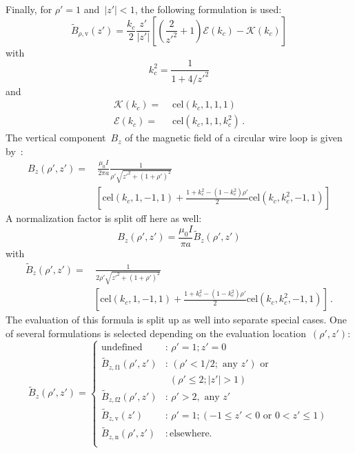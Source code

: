 Finally, for $\rho'=1$ and~$|z'| < 1$, the following formulation is used:
\begin{equation}
  \tilde{B}_{\rho,\mathrm{v}} (z')
  = \frac{k_c}{2} \frac{z'}{|z'|} \left[ \left( \frac{2}{z'^2} + 1 \right) \mathcal{E}(k_c) - \mathcal{K}(k_c) \right] \label{eqn:cwl_B_rho_v}
\end{equation}
with
\begin{equation}
  k_c^2 = \frac{1}{1 + 4/{z'}^2}
\end{equation}
and
\begin{align}
  \mathcal{K}(k_c) =&\, \,\mathrm{cel}(k_c, 1, 1, 1) \\
  \mathcal{E}(k_c) =&\, \,\mathrm{cel}(k_c, 1, 1, k_c^2) \, .
\end{align}
The vertical component~$B_z$ of the magnetic field of a circular wire loop is given by~\cite{teal}:
\begin{align}
 B_z(\rho', z')
 =&\, \frac{\mu_0 I}{2 \pi a}
   \frac{1}{\rho' \sqrt{z'^2 + (1 + \rho')^2}} \nonumber \\
 ~& \left[
       \textrm{cel}(k_c, 1, -1, 1)
     + \frac{1 + k_c^2 - \left( 1 - k_c^2 \right) \rho'}{2} \textrm{cel}(k_c, k_c^2, -1, 1)
   \right]
\end{align}
A normalization factor is split off here as well:
\begin{equation}
  B_z(\rho', z') = \frac{\mu_0 I}{\pi a} \tilde{B}_z(\rho', z')
\end{equation}
with
\begin{align}
  \tilde{B}_z(\rho', z')
  =&\, \frac{1}{2 \rho' \sqrt{z'^2 + (1 + \rho')^2}} \nonumber \\
 ~& \left[
       \textrm{cel}(k_c, 1, -1, 1)
     + \frac{1 + k_c^2 - \left( 1 - k_c^2 \right) \rho'}{2} \textrm{cel}(k_c, k_c^2, -1, 1)
   \right] \, .
\end{align}
The evaluation of this formula is split up as well into separate special cases.
One of several formulations is selected depending on the evaluation location~$(\rho', z')$:
\begin{equation}
  \tilde{B}_z(\rho', z')
  = \begin{cases}
      \textrm{undefined}                    &:\, \rho' = 1; z' = 0 \\
      \tilde{B}_{z,\mathrm{f1}} (\rho', z') &:\, (\rho' < 1/2; \textrm{ any } z') \textrm{ or } \\
                ~                           &~~  (\rho' \leq 2; |z'| > 1) \\
      \tilde{B}_{z,\mathrm{f2}} (\rho', z') &:\, \rho' > 2, \textrm{ any } z' \\
      \tilde{B}_{z,\mathrm{v}}  (z')        &:\, \rho' = 1; ( -1 \leq z' < 0 \textrm{ or } 0 < z' \leq 1) \\
      \tilde{B}_{z,\mathrm{n}}  (\rho', z') &:\, \textrm{elsewhere.} \\
    \end{cases} \label{eqn:cwl_B_z_switchover}
\end{equation}
